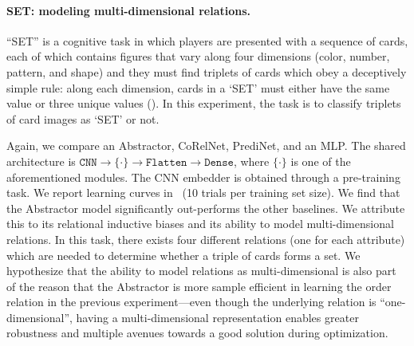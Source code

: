 \paragraph{SET: modeling multi-dimensional relations.}
``SET'' is a cognitive task in which 
players are presented with a sequence of cards, each of which contains figures that vary along four dimensions (color, number, pattern, and shape) and they must find triplets of cards which obey a deceptively simple rule: along each dimension, cards in a `SET' must either have the same value or three unique values (). %
In this experiment, the task is to classify triplets of card images as `SET' or not.

Again, we compare an Abstractor, CoRelNet, PrediNet, and an MLP. The shared architecture is $\texttt{CNN} \to \{\cdot\} \to \texttt{Flatten} \to \texttt{Dense}$, where $\{\cdot\}$ is one of the aforementioned modules. The CNN embedder is obtained through a pre-training task. We report learning curves in~ (10 trials per training set size). We find that the Abstractor model significantly out-performs the other baselines. We attribute this to its relational inductive biases and its ability to model multi-dimensional relations. In this task, there exists four different relations (one for each attribute) which are needed to determine whether a triple of cards forms a set.
We hypothesize that the ability to model relations as multi-dimensional is also part of the reason that the Abstractor is more sample efficient in learning the order relation in the previous experiment---even though the underlying relation is ``one-dimensional'', having a multi-dimensional representation enables greater robustness and multiple avenues towards a good solution during optimization.

